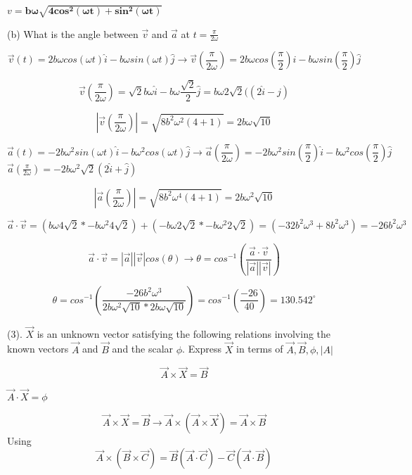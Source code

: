 \documentclass[12pt]{article}
\begin{document}
$
v = \boldsymbol{b \omega \sqrt{4cos^2(\omega t) + sin^2(\omega t)}}
$

\hfill \break



(b) What is the angle between $\vec{v}$ and $\vec{a}$ at $t=\frac{\pi}{2\omega}$

$$
\vec{v}(t) = 2b \omega cos(\omega t) \hat{i} - b\omega sin(\omega t) \hat{j} \rightarrow \vec{v}(\frac{\pi}{2\omega}) = 2b \omega cos(\frac{\pi}{2}) \hat{i} - b\omega sin(\frac{\pi}{2}) \hat{j}
$$

$$
\vec{v}(\frac{\pi}{2\omega}) = \sqrt{2}b\omega \hat{i} - b\omega \frac{\sqrt{2}}{2} \hat{j}= b \omega 2\sqrt{2} ((2\hat{i} - \hat{j})
$$

$$
|\vec{v}(\frac{\pi}{2\omega})| = \sqrt{8b^{2}\omega^{2}(4 + 1)} = 2b\omega \sqrt{10}
$$

$$
\vec{a}(t) = -2b \omega^2 sin(\omega t) \hat{i} - b\omega^2 cos(\omega t) \hat{j} \rightarrow \vec{a}(\frac{\pi}{2\omega}) = -2b \omega^2 sin(\frac{\pi}{2}) \hat{i} - b\omega^2 cos(\frac{\pi}{2}) \hat{j}
$$
$
\vec{a}(\frac{\pi}{2\omega}) = -2b\omega^{2}\sqrt{2}(2\hat{i}+\hat{j})
$

$$
|\vec{a}(\frac{\pi}{2\omega})| = \sqrt{8b^{2}\omega^{4}(4+1)} = 2b\omega^{2} \sqrt{10}
$$

$$
\vec{a} \cdot \vec{v} = (b\omega 4\sqrt{2} * -b\omega^{2} 4\sqrt{2}) + (-b\omega 2\sqrt{2} * -b\omega^{2} 2\sqrt{2}) = (-32b^{2}\omega^{3} + 8b^{2} \omega^{3}) = -26b^2\omega^3
$$

$$
\vec{a} \cdot \vec{v} = |\vec{a}||\vec{v}|cos(\theta) \rightarrow \theta = cos^{-1}(\frac{\vec{a} \cdot \vec{v}}{|\vec{a}||\vec{v}|})
$$

$$
\theta = cos^{-1}(\frac{-26b^2\omega^3}{2b\omega^{2} \sqrt{10} * 2b\omega \sqrt{10}}) = cos^{-1}(\frac{-26}{40}) = \boldsymbol{130.542^{\circ}}
$$

\hfill \break

(3). $\vec{X}$ is an unknown vector satisfying the following relations involving the known vectors $\vec{A}$ and $\vec{B}$ and the scalar $\phi$. Express $\vec{X}$ in terms of $\vec{A}, \vec{B}, \phi, |A|$ 

$$
\vec{A} \times \vec{X} = \vec{B}
$$

$
\vec{A} \cdot \vec{X} = \phi
$


$$
\vec{A} \times \vec{X} = \vec{B} \rightarrow \vec{A} \times (\vec{A} \times \vec{X}) = \vec{A} \times \vec{B}
$$
Using
$$
\vec{A} \times (\vec{B} \times \vec{C}) = \vec{B}(\vec{A} \cdot \vec{C}) - \vec{C}(\vec{A} \cdot \vec{B})
$$
\end{document}
